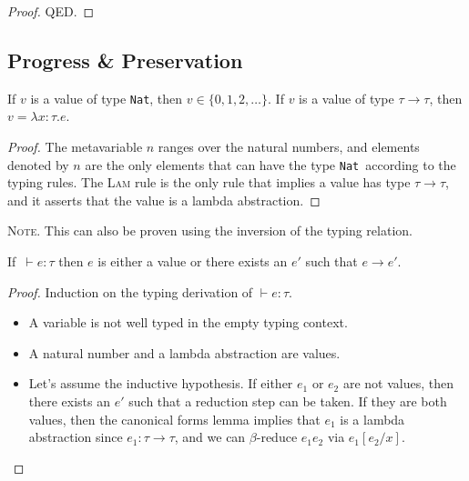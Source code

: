 \documentclass[nonacm]{acmart}
\newcommand{\nat}{\texttt{Nat}}
\begin{document}
\begin{proof}
  {\color{red} QED}.
\end{proof}

\subsection{Progress \& Preservation}

\begin{lemma}
  If $v$ is a value of type \nat, then \(v \in \{0, 1, 2, \dots \} \).
  If $v$ is a value of type \(\tau \rightarrow \tau \), then \(v = \lambda x:\tau.e\).
\end{lemma}

\begin{proof}
  The metavariable \(n\) ranges over the natural numbers, and elements denoted by
  \(n\) are the only elements that can have the type \nat~according to the typing
  rules. The \textsc{Lam} rule is the only rule that implies a value has type \(\tau \rightarrow
  \tau\), and it asserts that the value is a lambda abstraction.
\end{proof}

\textsc{Note}. This can also be proven using the inversion of the typing relation.

\begin{theorem}[Progress]
  If~\(\vdash e : \tau \) then \(e\) is either a value or there exists an \(e'\)
  such that \(e \rightarrow e'\).
\end{theorem}

\begin{proof}
  Induction on the typing derivation of \(\vdash e : \tau \).
  \begin{itemize}
    \item [\textsc{Var.}] A variable is not well typed in the empty typing context.
    \item [\textsc{Nat, Lam.}] A natural number and a lambda abstraction are values.
    \item [\textsc{App.}] Let's assume the inductive hypothesis. If either \(e_1\) or
    \(e_2\) are not values, then there exists an \(e'\) such that a reduction step can
    be taken. If they are both values, then the canonical forms lemma implies that
    \(e_1\) is a lambda abstraction since \(e_1 : \tau \rightarrow \tau \), and we can \(\beta \)-reduce \(e_1 e_2\) via
    \(e_1[e_2/x]\).
  \end{itemize}
\end{proof}
\end{document}
